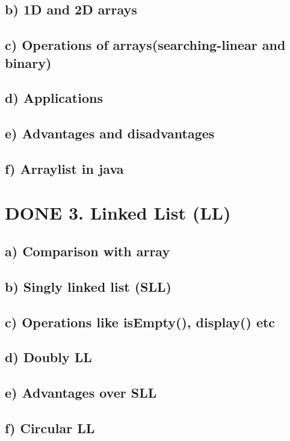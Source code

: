 \documentclass[11pt]{article}
\begin{document}
\subsection{b) 1D and 2D arrays}
\label{sec:orgb29ece1}
\subsection{c) Operations of arrays(searching-linear and binary)}
\label{sec:org5a5fbc2}
\subsection{d) Applications}
\label{sec:org08b0e54}
\subsection{e) Advantages and disadvantages}
\label{sec:org6fb524c}
\subsection{f) Arraylist in java}
\label{sec:orgd2b03be}
\section{{\bfseries\sffamily DONE} 3. Linked List (LL)}
\label{sec:org49854c8}
\subsection{a) Comparison with array}
\label{sec:org6293313}
\subsection{b) Singly linked list (SLL)}
\label{sec:org35aa88d}
\subsection{c) Operations like isEmpty(), display() etc}
\label{sec:org9c432b7}
\subsection{d) Doubly LL}
\label{sec:orgb760235}
\subsection{e) Advantages over SLL}
\label{sec:org37e4a92}
\subsection{f) Circular LL}
\label{sec:org03fdf2c}
\end{document}

